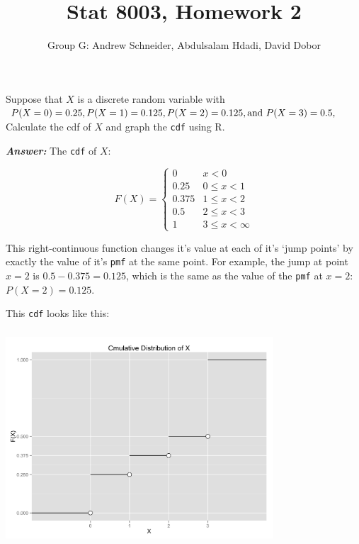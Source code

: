 \documentclass[12pt]{article}
\newenvironment{question}[2][Question]{\begin{trivlist}
\item[\hskip \labelsep {\bfseries #1}\hskip \labelsep {\bfseries #2.}]}{\end{trivlist}}
\begin{document}
 

 
\title{Stat 8003, Homework 2}%
\author{Group G: Andrew Schneider,  Abdulsalam Hdadi, David Dobor
\\ %
} %
 
\maketitle
 
 
\begin{question}{2.1} %
Suppose that $X$ is a discrete random variable with $P (X= 0) = 0.25, \\P (X = 1) = 0.125, P (X = 2) = 0.125, \text{and } P(X = 3) = 0.5, $ Calculate the cdf of $X$ and graph the \texttt{cdf} using $\mathrm{R}$.
\end{question}
 
 \textbf{\color{TealBlue}\emph{Answer:} } 
  The \texttt{cdf} of $X$: 
 
 \[ 
 F(X) = 
  \begin{cases} 
       0   & x <  0 \\
      0.25 & 0\leq x < 1 \\
      0.375 & 1\leq x < 2\\
      0.5 & 2\leq x < 3\\
      1 & 3\leq x < \infty 
   \end{cases}
\]
 
 This right-continuous function changes it's value at each of it's `jump points' by exactly the value of it's \texttt{pmf} at the same point. For example, the jump at point $ x = 2 $ is $0.5 - 0.375 = 0.125$, which is the same as the value of the \texttt{pmf} at  $ x = 2$: $P (X = 2) = 0.125.$ 
 
 This \texttt{cdf} looks like this:
 
 \begin{center}
\includegraphics[width=10cm, height=8cm]{cdf_plot}
\end{center}
\end{document}
